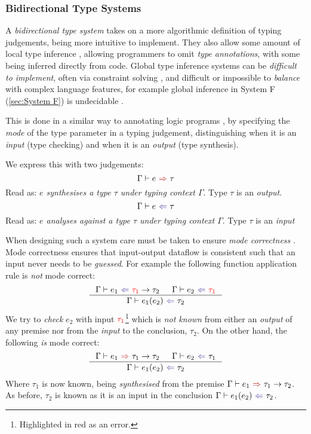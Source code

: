 \subsubsection{Bidirectional Type Systems}\label{sec:BidirectionalTypeSystem}
A \textit{bidirectional type system} \cite{BidirectionalTypes} takes on a more algorithmic definition of typing judgements, being more intuitive to implement. They also allow some amount of local type inference \cite{LocalInference}, allowing programmers to omit \textit{type annotations}, with some being inferred directly from code. Global type inference systems \cite[ch. 22]{TAPL} can be \textit{difficult to implement}, often via constraint solving \cite[ch. 10]{ATTAPL}, and difficult or impossible to \textit{balance} with complex language features, for example global inference in System F (\ref{sec:System F}) is undecidable \cite{SystemFUndecidable}.

This is done in a similar way to annotating logic programs \cite[123]{LogicProg}, by specifying the \textit{mode} of the type parameter in a typing judgement, distinguishing when it is an \textit{input} (type checking) and when it is an \textit{output} (type synthesis).

We express this with two judgements:
\[\synthesis{e}{\tau}\]
Read as: \textit{$e$ synthesises a type $\tau$ under typing context $\Gamma$}. Type $\tau$ is an \textit{output}.
\[\analysis{e}{\tau}\]
Read as: \textit{$e$ analyses against a type $\tau$ under typing context $\Gamma$}. Type $\tau$ is an \textit{input}

When designing such a system care must be taken to ensure \textit{mode correctness} \cite{ModeCorrectness}. Mode correctness ensures that input-output dataflow is consistent such that an input never needs to be \textit{guessed}. For example the following function application rule is \textit{not} mode correct:
\[\inference{\analysis{e_1}{{\color{red}\tau_1} \to \tau_2} & \analysis{e_2}{{\color{red}\tau_1}}}{\analysis{e_1(e_2)}{\tau_2}}\]
We try to \textit{check} $e_2$ with input ${\color{red}\tau_1}$\footnote{Highlighted in red as an error.} which is \textit{not known} from either an \textit{output} of any premise nor from the \textit{input} to the conclusion, $\tau_2$. On the other hand, the following \textit{is} mode correct:
\[\inference{\synthesis{e_1}{\tau_1 \to \tau_2} & \analysis{e_2}{\tau_1}}{\analysis{e_1(e_2)}{\tau_2}}\]
Where $\tau_1$ is now known, being \textit{synthesised} from the premise $\synthesis{e_1}{\tau_1 \to \tau_2}$. As before, $\tau_2$ is known as it is an input in the conclusion $\analysis{e_1(e_2)}{\tau_2}$.

